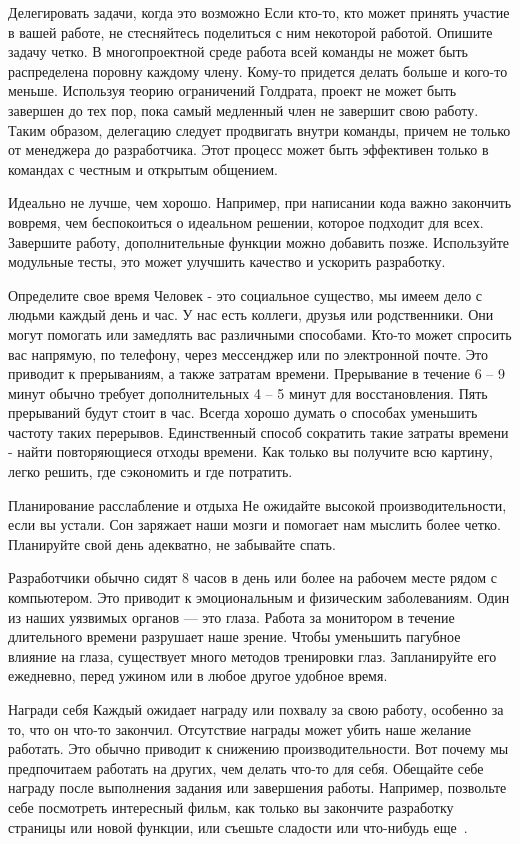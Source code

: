 \documentclass{../industrial-development}
\begin{document}
Делегировать задачи, когда это возможно
Если кто-то, кто может принять участие в вашей работе, не стесняйтесь поделиться с ним некоторой работой. Опишите задачу четко.
В многопроектной среде работа всей команды не может быть распределена поровну каждому члену. Кому-то придется делать больше и кого-то меньше. Используя теорию ограничений Голдрата, проект не может быть завершен до тех пор, пока самый медленный член не завершит свою работу. Таким образом, делегацию следует продвигать внутри команды, причем не только от менеджера до разработчика. Этот процесс может быть эффективен только в командах с честным и открытым общением.

Идеально не лучше, чем хорошо.
Например, при написании кода важно закончить вовремя, чем беспокоиться о идеальном решении, которое подходит для всех. Завершите работу, дополнительные функции можно добавить позже.  Используйте модульные тесты, это может улучшить качество и ускорить разработку.

Определите свое время
Человек - это социальное существо, мы имеем дело с людьми каждый день и час. У нас есть коллеги, друзья или родственники. Они могут помогать или замедлять вас различными способами. Кто-то может спросить вас напрямую, по телефону, через мессенджер или по электронной почте. Это приводит к прерываниям, а также затратам времени. Прерывание в течение 6 -- 9 минут обычно требует дополнительных 4 -- 5 минут для восстановления. Пять прерываний будут стоит в час. Всегда хорошо думать о способах уменьшить частоту таких перерывов. Единственный способ сократить такие затраты времени - найти повторяющиеся отходы времени. Как только вы получите всю картину, легко решить, где сэкономить и где потратить.

Планирование расслабление и отдыха
Не ожидайте высокой производительности, если вы устали. Сон заряжает наши мозги и помогает нам мыслить более четко. Планируйте свой день адекватно, не забывайте спать.

Разработчики обычно сидят 8 часов в день или более на рабочем месте рядом с компьютером. Это приводит к эмоциональным и физическим заболеваниям. Один из наших уязвимых органов --- это глаза. Работа за монитором в течение длительного времени разрушает наше зрение. Чтобы уменьшить пагубное влияние на глаза, существует много методов тренировки глаз. Запланируйте его ежедневно, перед ужином или в любое другое удобное время.

Награди себя
Каждый ожидает награду или похвалу за свою работу, особенно за то, что он что-то закончил. Отсутствие награды может убить наше желание работать. Это обычно приводит к снижению производительности. Вот почему мы предпочитаем работать на других, чем делать что-то для себя. Обещайте себе награду после выполнения задания или завершения работы. Например, позвольте себе посмотреть интересный фильм, как только вы закончите разработку страницы или новой функции, или съешьте сладости или что-нибудь еще~\cite{TMCodeProject}.
\end{document}
